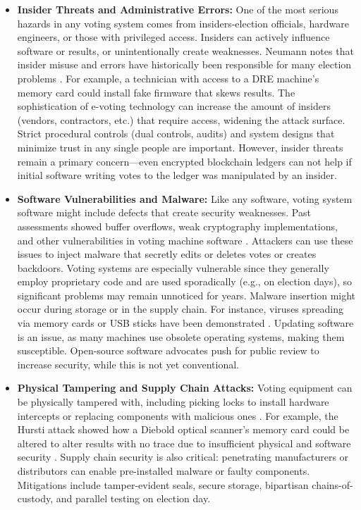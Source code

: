 \documentclass[a4paper,10pt]{report}
\begin{document}
\begin{itemize}
\item \textbf {Insider Threats and Administrative Errors:}  One of the most serious hazards in any voting system comes from insiders-election officials, hardware engineers, or those with privileged access.  Insiders can actively influence software or results, or unintentionally create weaknesses.  Neumann notes that insider misuse and errors have historically been responsible for many election problems \cite{neumann1996computer}.  For example, a technician with access to a DRE machine’s memory card could install fake firmware that skews results.  The sophistication of e-voting technology can increase the amount of insiders (vendors, contractors, etc.) that require access, widening the attack surface.  Strict procedural controls (dual controls, audits) and system designs that minimize trust in any single people are important.  However, insider threats remain a primary concern—even encrypted blockchain ledgers can not help if initial software writing votes to the ledger was manipulated by an insider.
    
     \item \textbf {Software Vulnerabilities and Malware:}  Like any software, voting system software might include defects that create security weaknesses.  Past assessments showed buffer overflows, weak cryptography implementations, and other vulnerabilities in voting machine software \cite{burr2011analysis}.  Attackers can use these issues to inject malware that secretly edits or deletes votes or creates backdoors.  Voting systems are especially vulnerable since they generally employ proprietary code and are used sporadically (e.g., on election days), so significant problems may remain unnoticed for years.  Malware insertion might occur during storage or in the supply chain.  For instance, viruses spreading via memory cards or USB sticks have been demonstrated \cite{uconn2012_combined}.  Updating software is an issue, as many machines use obsolete operating systems, making them susceptible.  Open-source software advocates push for public review to increase security, while this is not yet conventional.
    
     \item \textbf {Physical Tampering and Supply Chain Attacks:}  Voting equipment can be physically tampered with, including picking locks to install hardware intercepts or replacing components with malicious ones \cite{uconn2012_combined}.  For example, the Hursti attack showed how a Diebold optical scanner’s memory card could be altered to alter results with no trace due to insufficient physical and software security \cite{uconn2012_combined}.  Supply chain security is also critical: penetrating manufacturers or distributors can enable pre-installed malware or faulty components.  Mitigations include tamper-evident seals, secure storage, bipartisan chains-of-custody, and parallel testing on election day.
    

\end{itemize}
\end{document}
